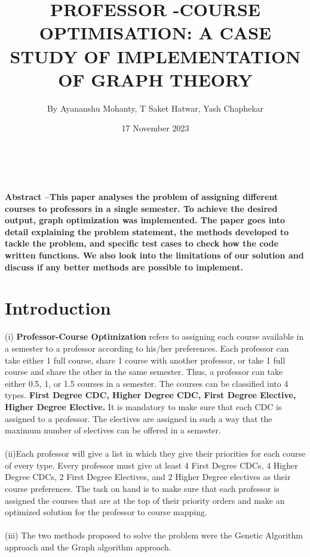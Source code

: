 \documentclass[a4paper,12pt]{article}
\title{\Large{\textbf {PROFESSOR -COURSE OPTIMISATION: A CASE STUDY OF IMPLEMENTATION OF GRAPH THEORY}}}
\author{By  Ayananshu Mohanty, T Saket Hatwar, Yash Chaphekar}
\date{17 November 2023}
\begin{document}
\small
{}
\setcounter{page}{1}
\fancyhf{}
\renewcommand{\headrulewidth}{2pt}
\renewcommand{\footrulewidth}{1pt}

\maketitle


\textbf{\textbf{
\\ \\ Abstract –This paper analyses the problem of assigning different courses to professors in a single semester. To achieve the desired output, graph optimization was implemented. The paper goes into detail explaining the problem statement, the methods developed to tackle the problem, and specific test cases to check how the code written functions. We also look into the limitations of our solution and discuss if any better methods are possible to implement.
}}

\section{Introduction}
(i)\textbf{ Professor-Course Optimization} refers to assigning each course available in a semester to a professor according to his/her preferences. Each professor can take either 1 full course, share 1 course with another professor, or take 1 full course and share the other in the same semester. Thus, a professor can take either 0.5, 1, or 1.5 courses in a semester. The courses can be classified into 4 types.\textbf{ First Degree CDC, Higher Degree CDC, First Degree Elective, Higher Degree Elective. }It is mandatory to make sure that each CDC is assigned to a professor. The electives are assigned in such a way that the maximum number of electives can be offered in a semester. \\ \\
(ii)Each professor will give a list in which they give their priorities for each course of every type. Every professor must give at least 4 First Degree CDCs, 4 Higher Degree CDCs, 2 First Degree Electives, and 2 Higher Degree electives as their course preferences. The task on hand is to make sure that each professor is assigned the courses that are at the top of their priority orders and make an optimized solution for the professor to course mapping. \\ \\
(iii) The two methods proposed to solve the problem were the Genetic Algorithm approach and the Graph algorithm approach. 
\end{document}
